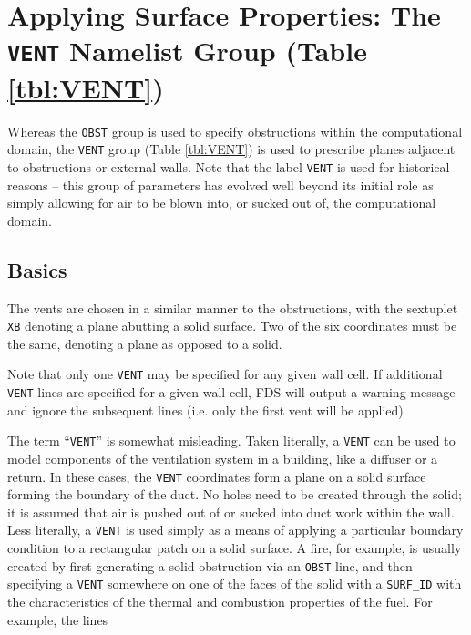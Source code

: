 \documentclass[11pt]{book}
\newcommand{\ct}{\tt\small}
\begin{document}
\section{Applying Surface Properties: The \texorpdfstring{{\tt VENT}}{VENT} Namelist Group (Table \ref{tbl:VENT})}
\label{info:VENT}

Whereas the {\ct OBST} group is used to specify obstructions within the
computational domain, the {\ct VENT} group (Table \ref{tbl:VENT}) is used to prescribe planes
adjacent to obstructions or external walls. Note that the label {\ct VENT} is used for historical reasons -- this group of parameters has
evolved well beyond its initial role as simply allowing for air to be blown into, or sucked out of, the computational domain.

\subsection{Basics}

\label{info:VENT_Basics}

The vents are chosen in a
similar manner to the obstructions, with the sextuplet {\ct XB}
denoting a plane abutting a solid surface. Two of the six coordinates must
be the same, denoting a plane as opposed to a solid.

\begin{warning}
\noindent
Note that only one {\ct VENT} may be specified for any given wall cell.  If additional {\ct VENT} lines are specified for a
given wall cell, FDS will output a warning message and ignore the subsequent lines (i.e. only the first vent
will be applied)
\end{warning}

\noindent The term ``{\ct VENT}'' is somewhat misleading. Taken literally, a
{\ct VENT} can be used to model components of the ventilation system in
a building, like a diffuser or a return.
In these cases, the {\ct VENT} coordinates form a plane on a
solid surface forming the boundary of the duct.
No holes need to be created through the solid; it is
assumed that air is pushed out of or sucked into duct work within the
wall. Less literally, a {\ct VENT} is used simply as a means of applying
a particular boundary condition to a rectangular patch on a solid surface.
A fire, for example, is usually created by first generating a solid
obstruction via an {\ct OBST} line, and then specifying a {\ct VENT}
somewhere on one of the faces of the solid with a {\ct SURF\_ID}
with the characteristics of the thermal and combustion properties of the fuel.
For example, the lines
\end{document}
